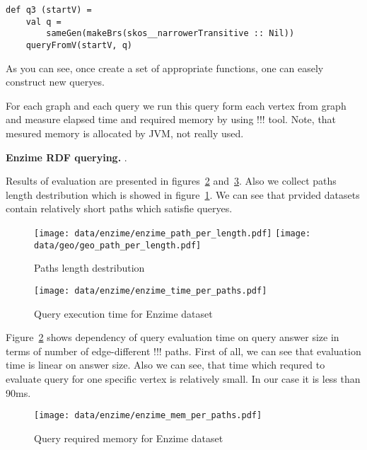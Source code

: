 \begin{lstlisting}
def q3 (startV) =
    val q =
        sameGen(makeBrs(skos__narrowerTransitive :: Nil))
    queryFromV(startV, q)
\end{lstlisting}

As you can see, once create a set of appropriate functions, one can easely construct new queryes.

For each graph and each query we run this query form each vertex from graph and measure elapsed time and required memory by using !!! tool.
Note, that mesured memory is allocated by JVM, not really used.


\textbf{Enzime RDF querying.} 
.

Results of evaluation are presented in figures~\ref{fig:enzime_time_per_paths} and~\ref{fig:enzime_mem_per_paths}.
Also we collect paths length destribution which is showed in figure~\ref{fig:pLength}.
We can see that prvided datasets contain relatively short paths which satisfie queryes.


\begin{figure}
\centering
    {\texttt{[image: data/enzime/enzime\_path\_per\_length.pdf]}}
{\texttt{[image: data/geo/geo\_path\_per\_length.pdf]}}
\caption{Paths length destribution}\label{fig:pLength}
\end{figure}

\begin{figure}[ht]
  \begin{center}
    \texttt{[image: data/enzime/enzime\_time\_per\_paths.pdf]}
    \caption{Query execution time for Enzime dataset}
    \label{fig:enzime_time_per_paths}
  \end{center}
\end{figure}

Figure~\ref{fig:enzime_time_per_paths} shows dependency of query evaluation time on query answer size in terms of number of edge-different !!! paths.
First of all, we can see that evaluation time is linear on answer size.
Also we can see, that time which requred to evaluate query for one specific vertex is relatively small.
In our case it is less than 90ms.

\begin{figure}[ht]
  \begin{center}
    \texttt{[image: data/enzime/enzime\_mem\_per\_paths.pdf]}
    \caption{Query required memory for Enzime dataset}
    \label{fig:enzime_mem_per_paths}
  \end{center}
\end{figure}

